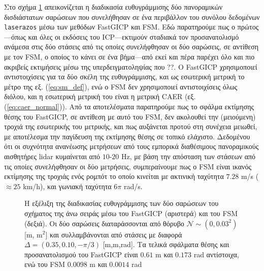 Στο σχήμα \ref{fig:02_05_04:02} απεικονίζεται η διαδικασία ευθυγράμμισης δύο
πανοραμικών δισδιάστατων σαρώσεων που συνελήθησαν σε ένα περιβάλλον του συνόλου
δεδομένων \texttt{laserazos} μέσω των μεθόδων FastGICP
και FSM.  Εδώ παρατηρούμε πως ο πρώτος---όπως και όλες οι εκδόσεις του
ICP---εκτιμούν σταδιακά τον προσανατολισμό ανάμεσα στις δύο στάσεις από τις
οποίες συνελήφθησαν οι δύο σαρώσεις, σε αντίθεση με τον FSM, ο οποίος
το κάνει σε ένα βήμα---από εκεί και πέρα παρέχει όλο και πιο ακριβείς
εκτιμήσεις μέσω της υπερδειγματοληψίας που ??. Ο FastGICP χρησιμοποιεί
αντιστοιχίσεις για τα δύο σκέλη της ευθυγράμμισης, και ως εσωτερική μετρική το
μέτρο της εξ.  (\ref{eq:sm_def}), ενώ ο FSM δεν χρησιμοποιεί
αντιστοιχίσεις όλως διόλου, και η εσωτερική μετρική του είναι η μετρική CAER
(εξ.  (\ref{eq:caer_normal})). Από τα αποτελέσματα παρατηρούμε πως το σφάλμα
εκτίμησης θέσης του FastGICP, σε αντίθεση με αυτό του FSM, δεν
ακολουθεί την (μειούμενη) τροχιά της εσωτερικής του μετρικής, και πως αυξάνεται
προτού στη συνέχεια μειωθεί, με αποτέλεσμα την παγίδευση της εκτίμησης θέσης σε
τοπικό ελάχιστο. Δεδομένου ότι οι συχνότητα ανανέωσης μετρήσεων από τους
εμπορικά διαθέσιμους πανοραμικούς αισθητήρες lidar κυμαίνεται από $10$-$20$ Hz,
με βάση την απόσταση των στάσεων από τις οποίες συνελήφθησαν οι δύο μετρήσεις,
συμπεραίνουμε πως ο FSM είναι ικανός εκτίμησης της τροχιάς ενός ρομπότ
το οποίο κινείται με ακτινική ταχύτητα $7.28$ m/s ($\approx 25$ km/h), και
γωνιακή ταχύτητα $6\pi$ rad/s.

\begin{figure}[]\centering
  
  \vspace{0.5cm}
  \caption{\small Η εξέλιξη της διαδικασίας ευθυγράμμισης των δύο σαρώσεων του
           σχήματος της άνω σειράς μέσω του FastGICP (αριστερά) και του
           FSM (δεξιά). Οι δύο σαρώσεις διαταράσσονται από θόρυβο
           $\mathcal{N} \sim (0, 0.03^2)$ [m, m$^2$] και συλλαμβάνονται από
           στάσεις με διαφορά $\Delta = (0.35, 0.10, -\pi/3)$ [m,m,rad].
           Τα τελικά σφάλματα θέσης και προσανατολισμού του FastGICP είναι
           $0.61$ m και $0.173$ rad αντίστοιχα, ενώ του FSM
           $0.0098$ m και $0.0014$ rad}
  \label{fig:02_05_04:02}
\end{figure}



